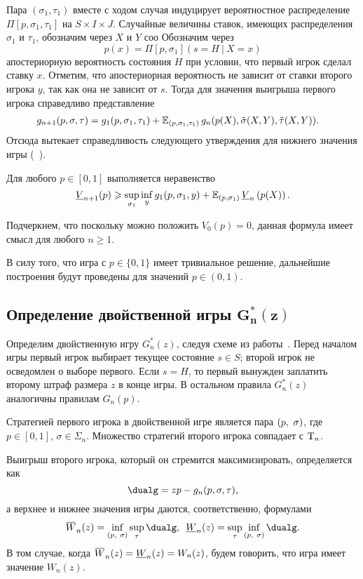 {Пара $(\sigma_1, \tau_1)$ вместе с ходом случая индуцирует вероятностное распределение $\Pi[p, \sigma_1, \tau_1]$ на $S \times I \times J$.
Случайные величины ставок, имеющих распределения $\sigma_1$ и $\tau_1$, обозначим через $X$ и $Y$ соо
Обозначим через
\[
  p(x) = \Pi[p, \sigma_1](s = H\ |\ X = x)
\]
апостериорную вероятность состояния $H$ при условии, что первый игрок сделал ставку $x$.
Отметим, что апостериорная вероятность не зависит от ставки второго игрока $y$, так как она не зависит от $s$.
Тогда для значения выигрыша первого игрока справедливо представление
\begin{align*}
  g_{n+1}(p, \sigma, \tau) 
  &= 
    g_1(p, \sigma_1, \tau_1) +
    \operatorname{\mathbb{E}}_{( p, \sigma_1, \tau_1 )}
    g_n(p(X), \tilde{\sigma}(X, Y), \tilde{\tau}(X, Y)).
\end{align*}
Отсюда вытекает справедливость следующего утверждения для нижнего значения игры (\seename~\cite{demeyer02}).
\begin{lemma}
  \label{ch3:lem:low-bound-primal}
  Для любого $p \in [0, 1]$ выполняется неравенство
  \begin{equation}
    \LV{n+1}(p) \geqslant \sup_{\sigma_1} \inf_{y} g_1(p, \sigma_1, y)
    + \E_{( p, \sigma_1 )} \LV{n}\left( p(X) \right).
  \end{equation}
\end{lemma}
Подчеркнем, что поскольку можно положить $V_0(p) = 0$, данная формула имеет смысл для любого $n \geqslant 1$.

В силу того, что игра с $p \in \{0, 1\}$ имеет тривиальное решение, дальнейшие построения будут проведены для значений $p \in (0, 1)$.

\subsection{Определение двойственной игры $\mathbf{ G^{*}_{n}(z) }$}
Определим двойственную игру $G^*_n(z)$, следуя схеме из работы~\cite{demeyer02}.
Перед началом игры первый игрок выбирает текущее состояние $s \in S$; второй игрок не осведомлен о выборе первого.
Если $s = H$, то первый вынужден заплатить второму штраф размера $z$ в конце игры.
В остальном правила $G^*_n(z)$ аналогичны правилам $G_n(p)$.

Стратегией первого игрока в двойственной игре является пара $(p,\ \sigma)$, где $p \in [0, 1]$, $\sigma \in \Sigma_n$.
Множество стратегий второго игрока совпадает с $\mathrm{T}_n$.

Выигрыш второго игрока, который он стремится максимизировать, определяется как
\begin{equation*}
  \dualg = z p - g_n(p, \sigma, \tau),
\end{equation*}
а верхнее и нижнее значения игры даются, соответственно, формулами
\begin{equation*}
  \HW{n}(z) = \inf_{\dualFPS} \sup_\tau \dualg, \enskip
  \LW{n}(z) = \sup_\tau \inf_{\dualFPS} \dualg.
\end{equation*}
В том случае, когда $\HW{n}(z) = \LW{n}(z) = W_n(z)$, будем говорить, что игра имеет значение $W_n(z)$.

}
